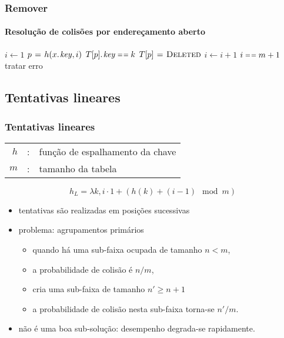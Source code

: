 \documentclass{beamer}
\begin{document}
\begin{frame}

\frametitle{Remover}
\framesubtitle{Resolução de colisões por endereçamento aberto}

\begin{codebox}
    \li $i \gets 1$
    \li \Repeat 
    \li   $p \gets h(\attrib{x}{key}, i)$ 
    \li   \If $\attrib{T[p]}{key} \isequal k$
    \li   \Then $T[p] \mathrel{\hspace{1pt}=\hspace{1pt}} \textnormal{\scshape Deleted}$
    \li     \Return
          \End
    \li   $i \gets i+1$
          \End
    \li \Until $i \isequal m+1$
    \li \Comment tratar erro 
\end{codebox}

\end{frame}

\subsection{Tentativas lineares}

\begin{frame}

\frametitle{Tentativas lineares}

\begin{tabular}{rcl}
$h$ & : & função de espalhamento da chave \\
$m$ & : & tamanho da tabela
\end{tabular}

$$h_L = \lambda k, i \cdot 1 + (h(k) + (i - 1) \mod m)$$

\begin{itemize}

\item tentativas são realizadas em posições sucessivas

\item problema: \alert{agrupamentos primários}

\begin{itemize}

  \item quando há uma sub-faixa ocupada de tamanho $n < m$, 

  \item a probabilidade de colisão é $n/m$, 

  \item cria uma sub-faixa de tamanho $n' \ge n+1$

  \item a probabilidade de colisão nesta sub-faixa torna-se $n'/m$.

\end{itemize}

\item não é uma boa sub-solução: desempenho degrada-se rapidamente.

\end{itemize}

\end{frame}
\end{document}
